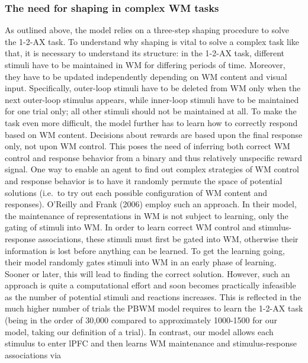 \documentclass[
  11pt,
  a4paper,
]{scrbook}
\begin{document}
\subsubsection*{The need for shaping in complex WM
tasks}\label{the-need-for-shaping-in-complex-wm-tasks}

As outlined above, the model relies on a three-step shaping procedure to
solve the 1-2-AX task. To understand why shaping is vital to solve a
complex task like that, it is necessary to understand its structure: in
the 1-2-AX task, different stimuli have to be maintained in WM for
differing periods of time. Moreover, they have to be updated
independently depending on WM content and visual input. Specifically,
outer-loop stimuli have to be deleted from WM only when the next
outer-loop stimulus appears, while inner-loop stimuli have to be
maintained for one trial only; all other stimuli should not be
maintained at all. To make the task even more difficult, the model
further has to learn how to correctly respond based on WM content.
Decisions about rewards are based upon the final response only, not upon
WM control. This poses the need of inferring both correct WM control and
response behavior from a binary and thus relatively unspecific reward
signal. One way to enable an agent to find out complex strategies of WM
control and response behavior is to have it randomly permute the space
of potential solutions (i.e.~to try out each possible configuration of
WM content and responses). O'Reilly and Frank (2006) employ such an
approach. In their model, the maintenance of representations in WM is
not subject to learning, only the gating of stimuli into WM. In order to
learn correct WM control and stimulus-response associations, these
stimuli must first be gated into WM, otherwise their information is lost
before anything can be learned. To get the learning going, their model
randomly gates stimuli into WM in an early phase of learning. Sooner or
later, this will lead to finding the correct solution. However, such an
approach is quite a computational effort and soon becomes practically
infeasible as the number of potential stimuli and reactions increases.
This is reflected in the much higher number of trials the PBWM model
requires to learn the 1-2-AX task (being in the order of 30,000 compared
to approximately 1000-1500 for our model, taking our definition of a
trial). In contrast, our model allows each stimulus to enter lPFC and
then learns WM maintenance and stimulus-response associations via
\end{document}
